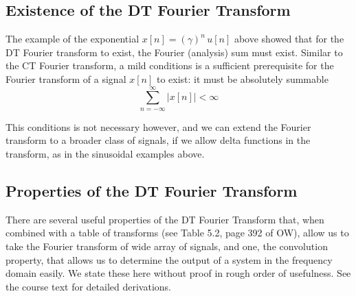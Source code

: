 \subsection{Existence of the DT Fourier Transform}

The example of the exponential $x[n] = \left(\gamma\right)^n\,u[n]$ above showed that for the DT Fourier transform to exist, the Fourier (analysis) sum must exist. Similar to the CT Fourier transform, a mild conditions is a sufficient prerequisite for the Fourier transform of a signal $x[n]$ to exist: it must be  absolutely summable
\[
\sum\limits_{n = -\infty}^{\infty} |x[n]| < \infty
\]

This conditions is not necessary however, and we can extend the Fourier transform to a broader class of signals, if we allow delta functions in the transform, as in the sinusoidal examples above. 

\subsection{Properties of the DT Fourier Transform}

There are several useful properties of the DT Fourier Transform that, when combined with a table of transforms (see Table 5.2, page 392 of OW), allow us to take the Fourier transform of  wide array of signals, and one, the convolution property, that allows us to determine the output of a system in the frequency domain easily. We state these here without proof in rough order of usefulness. See the course text for detailed derivations.

